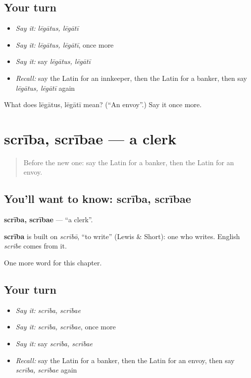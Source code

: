\subsection*{Your turn}
\begin{itemize}
\raggedright
  \item \emph{Say it:} \emph{lēgātus, lēgātī}
  \item \emph{Say it:} \emph{lēgātus, lēgātī}, once more
  \item \emph{Say it:} say \emph{lēgātus, lēgātī}
  \item \emph{Recall:} say the Latin for an innkeeper, then the Latin for a banker, then say \emph{lēgātus, lēgātī} again
\end{itemize}

\begin{tcolorbox}[breakable,colback=teal!4,colframe=teal!35!black,title={Before you move on}]
What does lēgātus, lēgātī mean? (\textquotedblleft{}An envoy\textquotedblright{}.) Say it once more.
\end{tcolorbox}
\section[scrība, scrībae]{scrība, scrībae — a clerk}

\label{lesson:LA-C272-scriba}



\begin{quote}
Before the new one: say the Latin for a banker, then the Latin for an envoy.
\end{quote}

\subsection*{You'll want to know: scrība, scrībae}
\textbf{scrība, scrībae} — \textquotedblleft{}a clerk\textquotedblright{}.

\begin{cousinweb}
\textbf{scrība} is built on \emph{scrībō}, \textquotedblleft{}to write\textquotedblright{} (Lewis \& Short): one who writes. English \emph{scribe} comes from it.
\end{cousinweb}

\begin{grammarlens}[title={What you've built}]
One more word for this chapter.
\end{grammarlens}

\subsection*{Your turn}
\begin{itemize}
\raggedright
  \item \emph{Say it:} \emph{scrība, scrībae}
  \item \emph{Say it:} \emph{scrība, scrībae}, once more
  \item \emph{Say it:} say \emph{scrība, scrībae}
  \item \emph{Recall:} say the Latin for a banker, then the Latin for an envoy, then say \emph{scrība, scrībae} again
\end{itemize}

